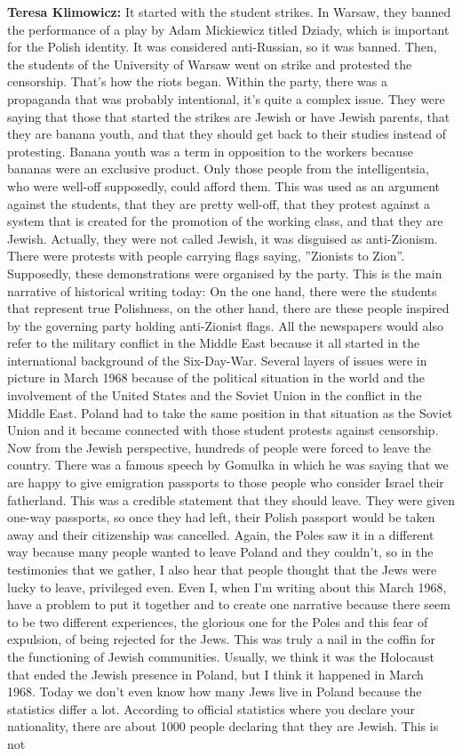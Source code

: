\textbf{Teresa Klimowicz:} It started with the student strikes. In Warsaw, they banned the performance of a play by Adam Mickiewicz titled Dziady, which is important for the Polish identity. It was considered anti-Russian, so it was banned. Then, the students of the University of Warsaw went on strike and protested the censorship. That's how the riots began. Within the party, there was a propaganda that was probably intentional, it's quite a complex issue. They were saying that those that started the strikes are Jewish or have Jewish parents, that they are banana youth, and that they should get back to their studies instead of protesting. Banana youth was a term in opposition to the workers because bananas were an exclusive product. Only those people from the intelligentsia, who were well-off supposedly, could afford them. This was used as an argument against the students, that they are pretty well-off, that they protest against a system that is created for the promotion of the working class, and that they are Jewish. Actually, they were not called Jewish, it was disguised as anti-Zionism. There were protests with people carrying flags saying, ''Zionists to Zion''. Supposedly, these demonstrations were organised by the party. This is the main narrative of historical writing today: On the one hand, there were the students that represent true Polishness, on the other hand, there are these people inspired by the governing party holding anti-Zionist flags. All the newspapers would also refer to the military conflict in the Middle East because it all started in the international background of the Six-Day-War. Several layers of issues were in picture in March 1968 because of the political situation in the world and the involvement of the United States and the Soviet Union in the conflict in the Middle East. Poland had to take the same position in that situation as the Soviet Union and it became connected with those student protests against censorship. Now from the Jewish perspective, hundreds of people were forced to leave the country. There was a famous speech by Gomułka in which he was saying that we are happy to give emigration passports to those people who consider Israel their fatherland. This was a credible statement that they should leave. They were given one-way passports, so once they had left, their Polish passport would be taken away and their citizenship was cancelled. Again, the Poles saw it in a different way because many people wanted to leave Poland and they couldn't, so in the testimonies that we gather, I also hear that people thought that the Jews were lucky to leave, privileged even. Even I, when I’m writing about this March 1968, have a problem to put it together and to create one narrative because there seem to be two different experiences, the glorious one for the Poles and this fear of expulsion, of being rejected for the Jews. This was truly a nail in the coffin for the functioning of Jewish communities. Usually, we think it was the Holocaust that ended the Jewish presence in Poland, but I think it happened in March 1968. Today we don't even know how many Jews live in Poland because the statistics differ a lot. According to official statistics where you declare your nationality, there are about 1000 people declaring that they are Jewish. This is not 